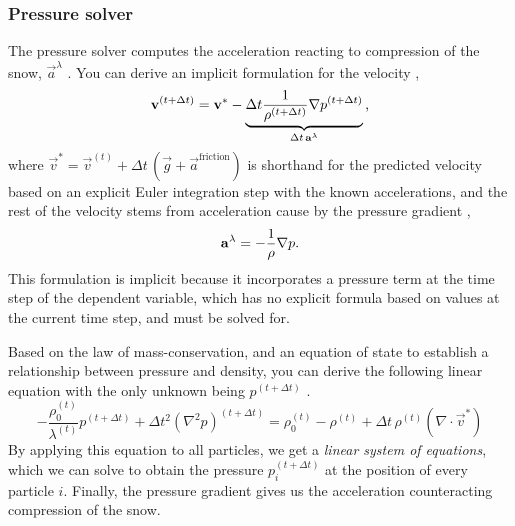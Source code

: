 \subsubsection*{Pressure solver}
The pressure solver computes the acceleration reacting to compression of the snow, 
$\vec a^\lambda$ \cite{icsph}.
You can derive an implicit formulation for the velocity \cite{icsph},
\begin{equation}
    \vec v^{(t + \Delta t)} = \vec v^* - 
    \underbrace{\Delta t \frac 1 {\rho^{(t+\Delta t)}} \nabla p^{(t + \Delta t)}}_{ \Delta t\, \vec a^{\lambda}}
    \text,
\end{equation}
where $\vec v^* =\vec v^{(t)} + \Delta t \, (\vec g + \vec a^{\text{friction}})$ is
shorthand  for the predicted velocity based on an explicit Euler integration step 
with the known accelerations,
and the rest of the velocity stems from acceleration cause by the pressure 
gradient \cite{chunnoo2022simulating},
\begin{equation}
    \label{eq:acc-grad-pressure}
    \vec a^{\lambda} = - \frac 1 {\rho} \nabla p \text.
\end{equation}
This formulation is implicit because it incorporates a pressure term at the time step of the dependent variable, which has no
explicit formula based on values at the current time step, and must be solved for.

Based on the law of mass-conservation, and an equation of state to establish a relationship between
pressure and density, you can derive the following linear equation with the only unknown being
$p^{(t + \Delta t)}$ \cite{icsph}.
\begin{equation}
    \label{eq:impl-pressure}
    - \frac {\rho_0^{(t)}} {\lambda^{(t)}} p^{(t + \Delta t)} + \Delta t^2 (\nabla^2 p)^{(t + \Delta t)}
    = \rho_0^{(t)} - \rho^{(t)} + \Delta t\, \rho^{(t)} (\nabla \cdot \vec v^*)
\end{equation}
By applying this equation to all particles, we get a {\em linear system of equations}, which we can solve
to obtain the pressure $p^{(t + \Delta t)}_i$ at the position of every particle $i$.
Finally, the pressure gradient gives us the acceleration counteracting compression of the snow.


